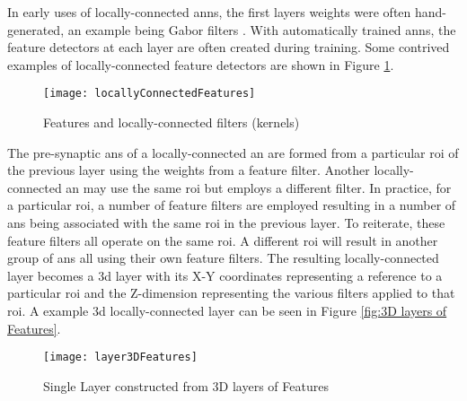\iffalse With locally-connected layers, the connection weights of the pre-synaptic \acp{an} are often formed from wanting to identify particular features. \fi
In early uses of locally-connected \acp{ann}, the first layers weights were often hand-generated, an example being Gabor filters \cite{Kwolek2005}. 
With automatically trained \acp{ann}, the feature detectors at each layer are often created during training.
Some contrived examples of locally-connected feature detectors are shown in Figure \ref{fig:Features and locally-connected filters (kernels)}.
\begin{figure}[h]
\centering
    \texttt{[image: locallyConnectedFeatures]}
    \captionsetup{justification=centering, skip=5pt}
    \caption{Features and locally-connected filters (kernels)}
    \label{fig:Features and locally-connected filters (kernels)}
\end{figure}

The pre-synaptic \acp{an} of a locally-connected \ac{an} are formed from a particular \ac{roi} of the previous layer using the weights from a feature filter. 
Another locally-connected \ac{an} may use the same \ac{roi} but employs a different filter.
In practice, for a particular \ac{roi}, a number of feature filters are employed resulting in a number of \acp{an} being associated with the same \ac{roi} in the previous layer. 
To reiterate, these feature filters all operate on the same \ac{roi}.
A different \ac{roi} will result in another group of \acp{an} all using their own feature filters.
The resulting locally-connected layer becomes a \ac{3d} layer with its X-Y coordinates representing a reference to a particular \ac{roi} and the Z-dimension representing the various filters applied to that \ac{roi}.
A example \ac{3d} locally-connected layer can be seen in Figure \ref{fig:3D layers of Features}.

\iffalse
A good example of the feature filters is image recognition \acp{ann}. The lower level features generated during automatic training are often intuitive and the filters are constructed to detect small features such as lines at various angles, different curves etc..
In the general \ac{dnn} case, the trained feature detectors may not be as intuitive.
\fi

\begin{figure}[h]
\centering
    \texttt{[image: layer3DFeatures]}
    \captionsetup{justification=centering, skip=5pt}
    \caption{Single Layer constructed from 3D layers of Features}
    \label{fig:3D layers of Features}
\label{fig:Layer Features}
\end{figure}

